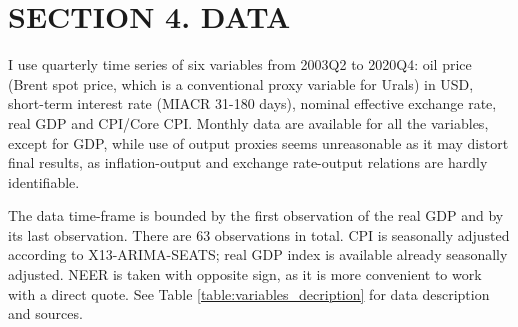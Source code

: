 \documentclass[12pt, a4paper]{extarticle}
\begin{document}
\begin{table}[h!]
	\centering
	\caption{Identification restrictions used to recover structural shocks. Positive (negative) signs describe non-strictly positive (negative) restrictions for variable's contemporaneous and next quarter response to a particular shock. Zero indicates for no contemporaneous reaction.}
	\label{tab:signs_and_zeros}
\end{table}

\clearpage
\section*{SECTION 4. DATA}
\setcounter{section}{2}

I use quarterly time series of six variables from 2003Q2 to 2020Q4: oil price (Brent spot price, which is a conventional proxy variable for Urals) in USD, short-term interest rate (MIACR 31-180 days), nominal effective exchange rate, real GDP and CPI/Core CPI. Monthly data are available for all the variables, except for GDP, while use of output proxies seems unreasonable as it may distort final results, as inflation-output and exchange rate-output relations are hardly identifiable.

The data time-frame is bounded by the first observation of the real GDP and by its last observation. There are 63 observations in total. CPI is seasonally adjusted according to X13-ARIMA-SEATS; real GDP index is available already seasonally adjusted. NEER is taken with opposite sign, as it is more convenient to work with a direct quote. See Table \ref{table:variables_decription} for data description and sources.
\end{document}

